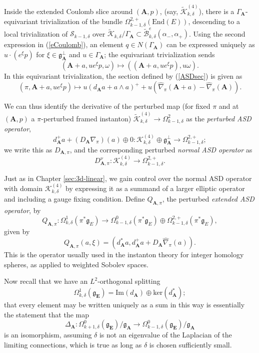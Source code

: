 \documentclass[10pt,a4paper]{amsart}
\theoremstyle{definition}
\theoremstyle{remark}
\numberwithin{figure}{qchap}
\begin{document}
Inside the extended Coulomb slice around $(\mathbf{A},p)$, (say, $\widetilde {\mathcal K}^{(4)}_{k,\delta}$), there is a $\Gamma_\mathbf{A}$-equivariant trivialization of the bundle $\Omega^{2,+}_{k-1,\delta}(\text{End}(E))$, descending to a local trivialization of $\mathcal S_{k-1,\delta}$ over $\widetilde{\mathcal K}_{k,\delta}/\Gamma_\mathbf{A} \subset \widetilde{\mathcal B}^e_{k,\delta}(\alpha_-, \alpha_+)$. Using the second expression in (\ref{eCoulomb}), an element $q \in N(\Gamma_{\mathbf{A}})$ can be expressed uniquely as $u \cdot (e^{\xi}p)$ for $\xi \in \mathfrak g_\mathbf{A}^\perp$ and $u \in \Gamma_{\mathbf{A}}$; the equivariant trivialization sends 
$$(\mathbf{A}+a, u e^{\xi} p,\omega) \mapsto ((\mathbf{A}+a, u e^{\xi} p),  u \omega).$$
In this equivariant trivialization, the section defined by (\ref{ASDsec}) is given as 
$$(\pi, \mathbf{A}+a, u e^{\xi} p) \mapsto u\left(d_{\mathbf{A}}a + a \wedge a\right)^+ + u\left(\widehat \nabla_\pi(\mathbf{A}+a) - \widehat \nabla_\pi(\mathbf{A})\right).$$

We can thus identify the derivative of the perturbed map (for fixed $\pi$ and at $(\mathbf{A},p)$ a $\pi$-perturbed framed instanton) $\widetilde{\mathcal K}^{(4)}_{k,\delta} \to \Omega^2_{k-1,\delta}$ as the \textit{perturbed ASD operator}, $$d_{\mathbf{A}}^+a + (D_{\mathbf{A}}\nabla_{\pi})(a) \oplus 0: \mathcal K^{(4)}_{k,\delta} \oplus \mathfrak g_{\mathbf{A}}^\perp \to \Omega^{2,+}_{k-1,\delta};$$ we write this as $D_{\mathbf{A},\pi}$, and the corresponding perturbed \textit{normal ASD operator} as $$D^\nu_{\mathbf{A},\pi}: \mathcal K^{(4)}_{k,\delta} \to \Omega^{2,+}_{k-1,\delta}.$$ 

Just as in Chapter \ref{sec:3d-linear}, we gain control over the normal ASD operator with domain $\mathcal K^{(4)}_{k,\delta}$ by expressing it as a summand of a larger elliptic operator and including a gauge fixing condition. Define $Q_{\mathbf{A},\pi}$, the perturbed \textit{extended ASD operator}, by $$Q_{\mathbf{A},\pi}: \Omega^1_{k,\delta}(\pi^*\mathfrak g_E) \to \Omega^0_{k-1,\delta}(\pi^*\mathfrak g_E) \oplus \Omega^{2,+}_{k-1,\delta}(\pi^*\mathfrak g_E),$$ given by $$Q_{\mathbf{A},\pi}(a,\xi) = (d_{\mathbf{A}}^* a, d_{\mathbf{A}}^+ a + D_{\mathbf{A}}\widehat{\nabla}_\pi(a)).$$ This is the operator usually used in the instanton theory for integer homology spheres, as applied to weighted Sobolev spaces.

Now recall that we have an $L^2$-orthogonal splitting 
$$\Omega^1_{k,\delta}(\mathfrak g_{\mathbf{E}}) = \text{Im}(d_{\mathbf{A}}) \oplus \text{ker}(d_{\mathbf{A}}^*);$$
that every element may be written uniquely as a sum in this way is essentially the statement that the map $$\Delta_{\mathbf{A}}: \Omega^0_{k+1,\delta}(\mathfrak g_{\mathbf{E}})/\mathfrak g_{\mathbf{A}} \to \Omega^0_{k-1,\delta}(\mathfrak g_{\mathbf{E}})/\mathfrak g_{\mathbf{A}}$$ 
is an isomorphism, assuming $\delta$ is not an eigenvalue of the Laplacian of the limiting connections, which is true as long as $\delta$ is chosen sufficiently small.
\end{document}
